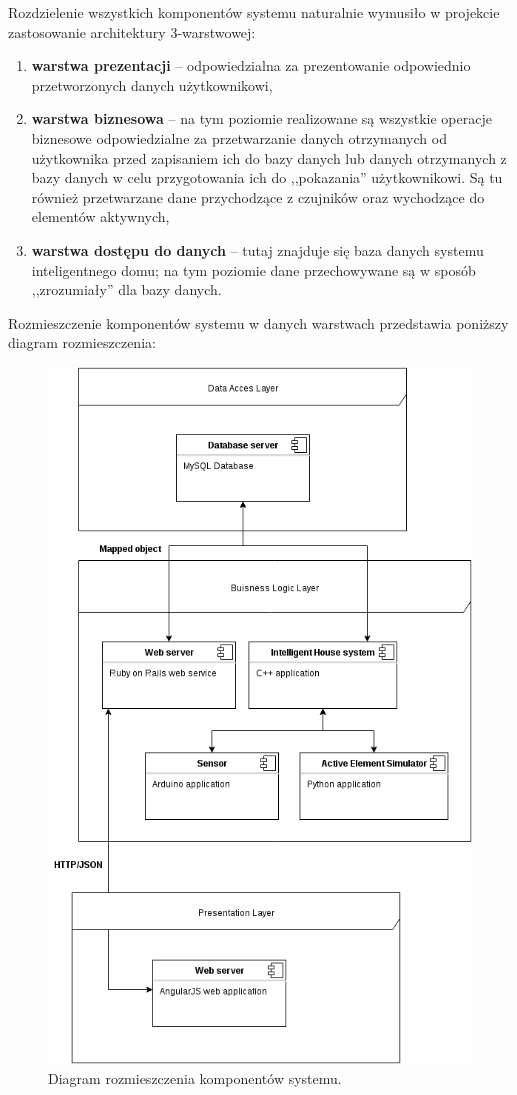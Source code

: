 \documentclass[eng,oneside]{mgr}
\begin{document}
Rozdzielenie wszystkich komponentów systemu naturalnie wymusiło w projekcie zastosowanie architektury 3-warstwowej:
\begin{enumerate}
	\item \textbf{warstwa prezentacji} – odpowiedzialna za prezentowanie odpowiednio przetworzonych danych użytkownikowi,
	\item \textbf{warstwa biznesowa} – na tym poziomie realizowane są wszystkie operacje biznesowe odpowiedzialne za przetwarzanie danych otrzymanych od użytkownika przed zapisaniem ich do bazy danych lub danych otrzymanych z bazy danych w celu przygotowania ich do ,,pokazania'' użytkownikowi. Są tu również przetwarzane dane przychodzące z czujników oraz wychodzące do elementów aktywnych,
	\item \textbf{warstwa dostępu do danych} – tutaj znajduje się baza danych systemu inteligentnego domu; na tym poziomie dane przechowywane są w sposób ,,zrozumiały'' dla bazy danych.
\end{enumerate}
Rozmieszczenie komponentów systemu w danych warstwach przedstawia poniższy diagram rozmieszczenia:
\clearpage
\begin{figure}[h]
\centering
\includegraphics[width=\linewidth]{layers}
\caption{Diagram rozmieszczenia komponentów systemu.}
\label{fig:diagram_rozmieszczenia}
\end{figure}
\end{document}
